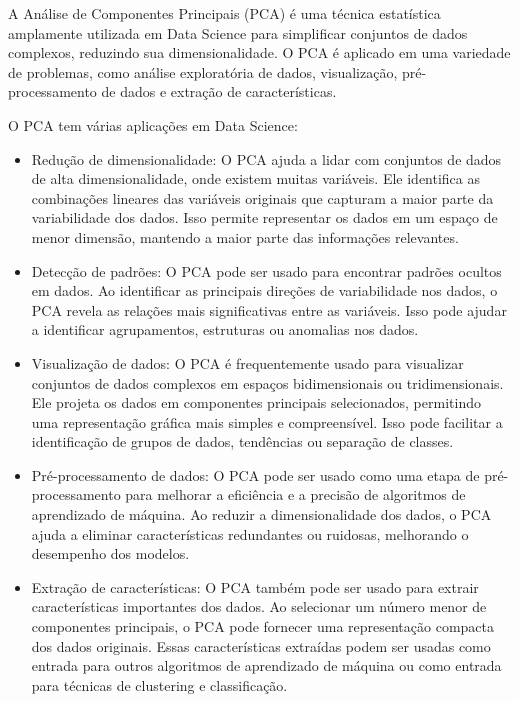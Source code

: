 \documentclass[12pt, a4paper]{article}
\begin{document}
\begin{enumerate}
A Análise de Componentes Principais (PCA) é uma técnica estatística amplamente utilizada em Data Science para simplificar conjuntos de dados complexos, reduzindo sua dimensionalidade. O PCA é aplicado em uma variedade de problemas, como análise exploratória de dados, visualização, pré-processamento de dados e extração de características.

O PCA tem várias aplicações em Data Science:

\begin{itemize}
    \item Redução de dimensionalidade: O PCA ajuda a lidar com conjuntos de dados de alta dimensionalidade, onde existem muitas variáveis. Ele identifica as combinações lineares das variáveis originais que capturam a maior parte da variabilidade dos dados. Isso permite representar os dados em um espaço de menor dimensão, mantendo a maior parte das informações relevantes.
    
    \item Detecção de padrões: O PCA pode ser usado para encontrar padrões ocultos em dados. Ao identificar as principais direções de variabilidade nos dados, o PCA revela as relações mais significativas entre as variáveis. Isso pode ajudar a identificar agrupamentos, estruturas ou anomalias nos dados.
    
    \item Visualização de dados: O PCA é frequentemente usado para visualizar conjuntos de dados complexos em espaços bidimensionais ou tridimensionais. Ele projeta os dados em componentes principais selecionados, permitindo uma representação gráfica mais simples e compreensível. Isso pode facilitar a identificação de grupos de dados, tendências ou separação de classes.
    
    \item Pré-processamento de dados: O PCA pode ser usado como uma etapa de pré-processamento para melhorar a eficiência e a precisão de algoritmos de aprendizado de máquina. Ao reduzir a dimensionalidade dos dados, o PCA ajuda a eliminar características redundantes ou ruidosas, melhorando o desempenho dos modelos.
    
    \item Extração de características: O PCA também pode ser usado para extrair características importantes dos dados. Ao selecionar um número menor de componentes principais, o PCA pode fornecer uma representação compacta dos dados originais. Essas características extraídas podem ser usadas como entrada para outros algoritmos de aprendizado de máquina ou como entrada para técnicas de clustering e classificação.
    \end{itemize}


\end{enumerate}
\end{document}
